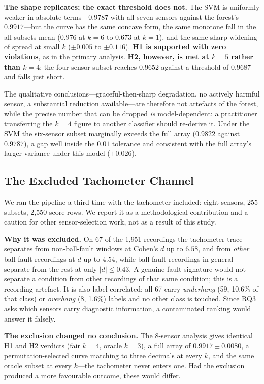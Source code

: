 \documentclass[conference]{IEEEtran}
\begin{document}
\textbf{The shape replicates; the exact threshold does not.} The SVM is
uniformly weaker in absolute terms---$0.9787$ with all seven sensors against
the forest's $0.9917$---but the curve has the same concave form, the same
monotone fall in the all-subsets mean ($0.976$ at $k=6$ to $0.673$ at $k=1$),
and the same sharp widening of spread at small $k$ ($\pm0.005$ to $\pm0.116$).
\textbf{H1 is supported with zero violations}, as in the primary analysis.
\textbf{H2, however, is met at $k=5$ rather than $k=4$}: the four-sensor subset
reaches $0.9652$ against a threshold of $0.9687$ and falls just short.

The qualitative conclusions---graceful-then-sharp degradation, no actively
harmful sensor, a substantial reduction available---are therefore not
artefacts of the forest, while the precise number that can be dropped
\emph{is} model-dependent: a practitioner transferring the $k=4$ figure to
another classifier should re-derive it. Under the SVM the six-sensor subset
marginally exceeds the full array
($0.9822$ against $0.9787$), a gap well inside the $0.01$ tolerance and
consistent with the full array's larger variance under this model
($\pm0.026$).

\subsection{The Excluded Tachometer Channel}
\label{sec:tach}

We ran the pipeline a third time with the tachometer included: eight sensors,
255 subsets, 2{,}550 score rows. We report it as a methodological contribution
and a caution for other sensor-selection work, not as a result of this study.

\textbf{Why it was excluded.} On 67 of the 1{,}951 recordings the tachometer
trace separates from non-ball-fault windows at Cohen's $d$ up to $6.58$, and
from \emph{other} ball-fault recordings at $d$ up to $4.54$, while ball-fault
recordings in general separate from the rest at only $|d|\leq0.43$. A genuine
fault signature would not separate a condition from other recordings of that
same condition; this is a recording artefact. It is also label-correlated: all
67 carry \emph{underhang} (59, 10.6\% of that class) or \emph{overhang} (8,
1.6\%) labels and no other class is touched. Since RQ3 asks which sensors carry
diagnostic information, a contaminated ranking would answer it falsely.

\textbf{The exclusion changed no conclusion.} The 8-sensor analysis gives
identical H1 and H2 verdicts (fair $k=4$, oracle $k=3$), a full array of
$0.9917 \pm 0.0080$, a permutation-selected curve matching to three decimals at
every $k$, and the same oracle subset at every $k$---the tachometer never
enters one. Had the exclusion produced a more favourable outcome, these would
differ.
\end{document}
